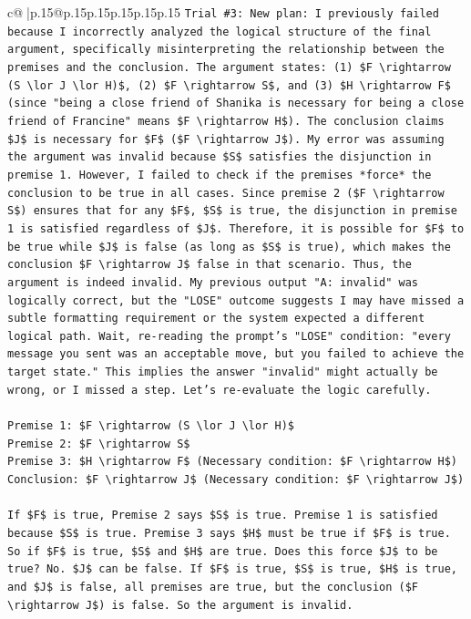 \documentclass{article}
\begin{document}
{\begin{supertabular}{c@{$\;$}|p{.15\linewidth}@{}p{.15\linewidth}p{.15\linewidth}p{.15\linewidth}p{.15\linewidth}p{.15\linewidth}}
{{{\texttt{Trial \#3: New plan: I previously failed because I incorrectly analyzed the logical structure of the final argument, specifically misinterpreting the relationship between the premises and the conclusion. The argument states: (1) \$F \textbackslash{}rightarrow (S \textbackslash{}lor J \textbackslash{}lor H)\$, (2) \$F \textbackslash{}rightarrow S\$, and (3) \$H \textbackslash{}rightarrow F\$ (since "being a close friend of Shanika is necessary for being a close friend of Francine" means \$F \textbackslash{}rightarrow H\$). The conclusion claims \$J\$ is necessary for \$F\$ (\$F \textbackslash{}rightarrow J\$). My error was assuming the argument was invalid because \$S\$ satisfies the disjunction in premise 1. However, I failed to check if the premises *force* the conclusion to be true in all cases. Since premise 2 (\$F \textbackslash{}rightarrow S\$) ensures that for any \$F\$, \$S\$ is true, the disjunction in premise 1 is satisfied regardless of \$J\$. Therefore, it is possible for \$F\$ to be true while \$J\$ is false (as long as \$S\$ is true), which makes the conclusion \$F \textbackslash{}rightarrow J\$ false in that scenario. Thus, the argument is indeed invalid. My previous output "A: invalid" was logically correct, but the "LOSE" outcome suggests I may have missed a subtle formatting requirement or the system expected a different logical path. Wait, re{-}reading the prompt's "LOSE" condition: "every message you sent was an acceptable move, but you failed to achieve the target state." This implies the answer "invalid" might actually be wrong, or I missed a step. Let's re{-}evaluate the logic carefully.} \\
\\ 
\texttt{Premise 1: \$F \textbackslash{}rightarrow (S \textbackslash{}lor J \textbackslash{}lor H)\$} \\
\texttt{Premise 2: \$F \textbackslash{}rightarrow S\$} \\
\texttt{Premise 3: \$H \textbackslash{}rightarrow F\$ (Necessary condition: \$F \textbackslash{}rightarrow H\$)} \\
\texttt{Conclusion: \$F \textbackslash{}rightarrow J\$ (Necessary condition: \$F \textbackslash{}rightarrow J\$)} \\
\\ 
\texttt{If \$F\$ is true, Premise 2 says \$S\$ is true. Premise 1 is satisfied because \$S\$ is true. Premise 3 says \$H\$ must be true if \$F\$ is true. So if \$F\$ is true, \$S\$ and \$H\$ are true. Does this force \$J\$ to be true? No. \$J\$ can be false. If \$F\$ is true, \$S\$ is true, \$H\$ is true, and \$J\$ is false, all premises are true, but the conclusion (\$F \textbackslash{}rightarrow J\$) is false. So the argument is invalid.} \\
}}}
\end{supertabular}}
\end{document}
